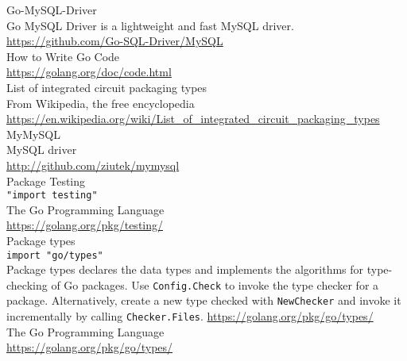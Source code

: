 \documentclass[12pt,letterpaper,dvips]{article}
\begin{document}
\noindent Go-MySQL-Driver\\
Go MySQL Driver is a lightweight and fast MySQL driver.\\
\href{https://github.com/Go-SQL-Driver/MySQL/}{https://github.com/Go-SQL-Driver/MySQL}
\\

\noindent How to Write Go Code\\
\href{https://golang.org/doc/code.html}{https://golang.org/doc/code.html}
\\

\noindent List of integrated circuit packaging types\\
From Wikipedia, the free encyclopedia\\
\href{https://en.wikipedia.org/wiki/List\_of\_integrated\_circuit\_packaging\_types}{https://en.wikipedia.org/wiki/List\_of\_integrated\_circuit\_packaging\_types}
\\

\noindent MyMySQL\\
MySQL driver\\
\href{http://github.com/ziutek/mymysql}{http://github.com/ziutek/mymysql}
\\

\noindent Package Testing\\
\texttt{"import testing"}\\
The Go Programming Language\\
\href{https://golang.org/pkg/testing/}{https://golang.org/pkg/testing/}
\\

\noindent Package types\\
\texttt{import "go/types"}\\
Package types declares the data types and implements
the algorithms for type-checking of Go packages. Use
\texttt{Config.Check} to invoke the type checker for
a package.  Alternatively, create a new type checked
with \texttt{NewChecker} and invoke it incrementally
by calling \texttt{Checker.Files}.
\href{https://golang.org/pkg/go/types/}{https://golang.org/pkg/go/types/}
\\

\noindent The Go Programming Language\\
\href{https://golang.org/pkg/go/types/}{https://golang.org/pkg/go/types/}
\\
\end{document}
